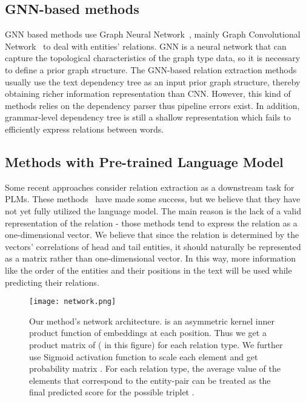 \documentclass[11pt,a4paper]{article}
\begin{document}
\subsection{GNN-based methods} GNN based methods use Graph Neural Network~\cite{scarselli2008graph}, mainly Graph Convolutional Network~\cite{kipf2016semi} to deal with entities' relations. GNN is a neural network that can capture the topological characteristics of the graph type data, so it is necessary to define a prior graph structure. The GNN-based relation extraction methods~\cite{zhang2018graph,guo2019attention,fu2019graphrel} usually use the text dependency tree as an input prior graph structure, thereby obtaining richer information representation than CNN. However, this kind of methods relies on the dependency parser thus pipeline errors exist. In addition, grammar-level dependency tree is still a shallow representation which fails to efficiently express relations between words. 

\subsection{Methods with Pre-trained Language Model}
Some recent approaches consider relation extraction as a downstream task for PLMs. These methods~\cite{zhang2019ernie,soares2019matching,joshi2019spanbert,wei2019novel} have made some success, but we believe that they have not yet fully utilized the language model. The main reason is the lack of a valid representation of the relation - those methods tend to express the relation as a one-dimensional vector. We believe that since the relation is determined by the vectors' correlations of head and tail entities, it should naturally be represented as a matrix rather than one-dimensional vector. In this way, more information like the order of the entities and their positions in the text will be used while predicting their relations.


\begin{figure*}[ht]

\centering
\texttt{[image: network.png]}
\caption{Our method's network architecture.  is an asymmetric kernel inner product function of embeddings at each position. Thus we get a product matrix of  ( in this figure) for each relation type. We further use Sigmoid activation function to scale each element and get probability matrix . For each relation type, the average value of the elements that correspond to the entity-pair can be treated as the final predicted score for the possible triplet .}
\label{netfig}
\end{figure*}
\end{document}
